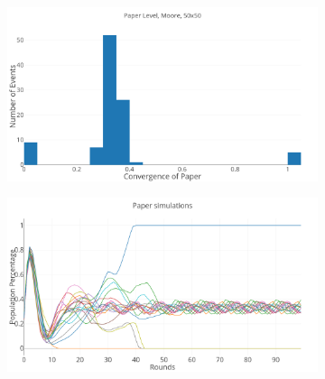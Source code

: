 \documentclass[a4paper, 11pt]{article}
\begin{document}
\begin{figure}[H]
	\begin{subfigure}{0.52\textwidth}
		\includegraphics[width=1\linewidth]{50x50_50RockDist_PaperHG}
	\end{subfigure}%
	\begin{subfigure}{0.52\textwidth}
		\includegraphics[width=1\linewidth]{50x50_50RockDist_IndividualPaper}
	\end{subfigure}
	

\end{figure}
\end{document}
